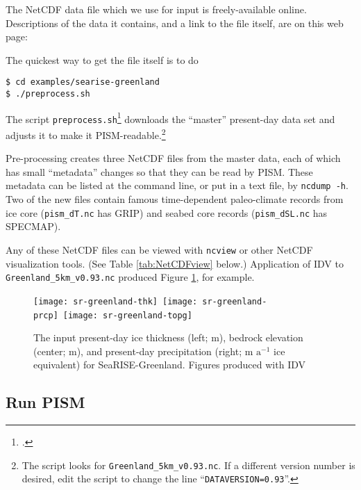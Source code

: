 The NetCDF data file which we use for input is freely-available online.  Descriptions of the data it contains, and a link to the file itself, are on this web page: 
\medskip

\centerline{}
\medskip

\noindent The quickest way to get the file itself is to do
\begin{verbatim}
$ cd examples/searise-greenland
$ ./preprocess.sh
\end{verbatim}
\noindent The script \texttt{preprocess.sh}\footnote{.} downloads the ``master'' present-day data set and adjusts it to make it PISM-readable.\footnote{The script looks for \texttt{Greenland\_5km\_v0.93.nc}.  If a different version number is desired, edit the script to change the line ``\texttt{DATAVERSION=0.93}''.}

Pre-processing creates three NetCDF files from the master data, each of which has small ``metadata'' changes so that they can be read by PISM.  These metadata can be listed at the command line, or put in a text file, by \texttt{ncdump -h}.  Two of the new files contain famous time-dependent paleo-climate records from ice core (\texttt{pism_dT.nc} has GRIP) and seabed core records (\texttt{pism_dSL.nc} has SPECMAP).

Any of these NetCDF files can be viewed with \texttt{ncview} or other NetCDF visualization tools.  (See Table \ref{tab:NetCDFview} below.)  Application of IDV to \texttt{Greenland_5km_v0.93.nc} produced Figure \ref{fig:sr-input}, for example.

\begin{figure}[ht]
\centering
\mbox{\texttt{[image: sr-greenland-thk]}
 \qquad \texttt{[image: sr-greenland-prcp]} \qquad \texttt{[image: sr-greenland-topg]}}
\caption{The input present-day ice thickness (left; m), bedrock elevation (center; m), and present-day precipitation (right; m $\text{a}^{-1}$ ice equivalent) for SeaRISE-Greenland.  Figures produced with IDV}
\label{fig:sr-input}
\end{figure}



\subsection{Run PISM}

